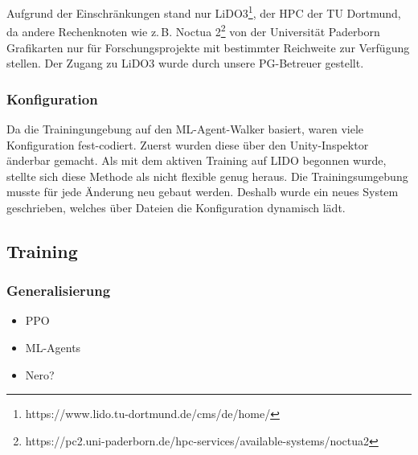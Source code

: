 Aufgrund der Einschränkungen stand nur LiDO3\footnote{https://www.lido.tu-dortmund.de/cms/de/home/}, der HPC der TU Dortmund, da andere Rechenknoten wie z.\,B. Noctua 2\footnote{https://pc2.uni-paderborn.de/hpc-services/available-systems/noctua2} von der Universität Paderborn Grafikarten nur für Forschungsprojekte mit bestimmter Reichweite zur Verfügung stellen. Der Zugang zu LiDO3 wurde durch unsere PG-Betreuer gestellt.
\subsubsection{Konfiguration}
Da die Trainingungebung auf den ML-Agent-Walker basiert, waren viele Konfiguration fest-codiert. Zuerst wurden diese über den Unity-Inspektor änderbar gemacht. Als mit dem aktiven Training auf LIDO begonnen wurde, stellte sich diese Methode als nicht flexible genug heraus. Die Trainingsumgebung musste für jede Änderung neu gebaut werden. Deshalb wurde ein neues System geschrieben, welches über Dateien die Konfiguration dynamisch lädt.

\subsection{Training}
\subsubsection{Generalisierung}
\begin{itemize}
	\item PPO
	\item ML-Agents
	\item Nero?
\end{itemize}


